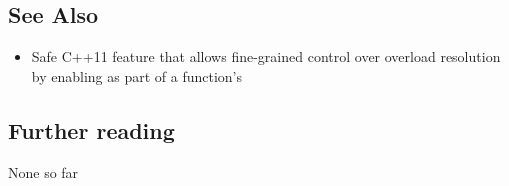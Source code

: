 \subsection[See Also]{See Also}\label{see-also}

\begin{itemize}
\item{%
Safe C++11 feature that allows fine-grained control over overload resolution by enabling  as part of a function’s }
\end{itemize}

\subsection[Further reading]{Further reading}\label{further-reading}

None so far


